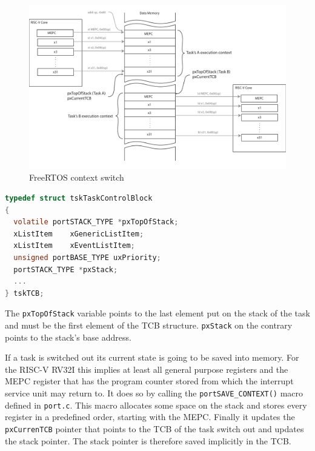 \begin{figure}[t]
 \centering
 \includegraphics[width=\linewidth]{./figures/freertos_context_switch}
 \caption{FreeRTOS context switch}
 \label{fig:context_switch}
\end{figure}

\begin{minipage}{\linewidth}
\begin{lstlisting}[language=C,emph={xListItem,portSTACK_TYPE}]
typedef struct tskTaskControlBlock
{
  volatile portSTACK_TYPE *pxTopOfStack;
  xListItem    xGenericListItem;
  xListItem    xEventListItem;
  unsigned portBASE_TYPE uxPriority;
  portSTACK_TYPE *pxStack;
  ...
} tskTCB;
\end{lstlisting}
\end{minipage}


The \verb+pxTopOfStack+ variable points to the last element put on the stack of the task and must be the first element of the TCB structure. \verb+pxStack+ on the contrary points to the stack's base address.

If a task is switched out its current state is going to be saved into memory. For the RISC-V RV32I this implies at least all general purpose registers and the MEPC register that has the program counter stored from which the interrupt service unit may return to. It does so by calling the \verb+portSAVE_CONTEXT()+ macro defined in \verb+port.c+. This macro allocates some space on the stack and stores every register in a predefined order, starting with the MEPC. Finally it updates the \verb+pxCurrenTCB+ pointer that points to the TCB of the task switch out and updates the stack pointer. The stack pointer is therefore saved implicitly in the TCB.

